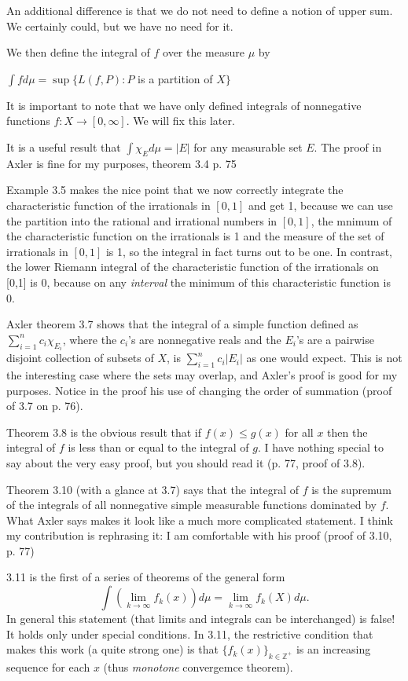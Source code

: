 \documentclass[12pt]{article}
\begin{document}
An additional difference is that we do not need to define a notion of upper sum.  We certainly could, but we have no need for it.

We then define the integral of $f$ over the measure $\mu$ by

$\int f d\mu = \sup\{L(f,P): P$ is a partition of $X\}$

It is important to note that we have only defined integrals of nonnegative functions $f:X \rightarrow [0,\infty]$.  We will fix this later.

It is a useful result that $\int \chi_E d \mu= |E|$ for any measurable set $E$.  The proof in Axler is fine for my purposes, theorem 3.4 p. 75

Example 3.5 makes the nice point that we now correctly integrate the characteristic function of the irrationals in $[0,1]$ and get 1, because we can
use the partition into the rational and irrational numbers in $[0,1]$, the mnimum of the characteristic function on the irrationals is 1 and the measure of the set of irrationals in $[0,1]$ is 1, so the integral in fact turns out to be one.  In contrast, the lower Riemann integral of the characteristic function of the irrationals on [0,1] is 0, because on any {\em interval\/} the minimum of this characteristic function is 0.

Axler theorem 3.7 shows that the integral of a simple function defined as $\sum_{i=1}^n c_i \chi_{E_i}$, where the $c_i$'s are nonnegative reals and the $E_i$'s are a pairwise disjoint collection of subsets of $X$, is $\sum_{i=1}^n c_i|E_i|$ as one would expect.  This is not the interesting case where the sets may overlap, and Axler's proof is good for my purposes.  Notice in the proof his use of changing the order of summation (proof of 3.7 on p. 76).

Theorem 3.8 is the obvious result that if $f(x) \leq g(x)$ for all $x$ then the integral of $f$ is less than or equal to the integral of $g$.  I have nothing special to say about the very easy proof, but you should read it (p. 77, proof of 3.8).

Theorem 3.10 (with a glance at 3.7) says that the integral of $f$ is the supremum of the integrals of all nonnegative simple measurable functions dominated by $f$.  What Axler says makes it look like a much more complicated statement.  I think my contribution is rephrasing it:  I am comfortable with his proof (proof of 3.10, p. 77)

3.11 is the first of a series of theorems of the general form $$\int (\lim_{k \rightarrow \infty}f_k(x)) d \mu = \lim_{k \rightarrow \infty} f_k(X) d\mu.$$  In general this statement (that limits and integrals can be interchanged) is false!  It holds only under special conditions.  In 3.11, the restrictive condition that makes this work (a quite strong one) is that
$\{f_k(x)\}_{k \in {\mathbb Z}^+}$ is an increasing sequence for each $x$ (thus {\em monotone\/} convergemce theorem).
\end{document}
